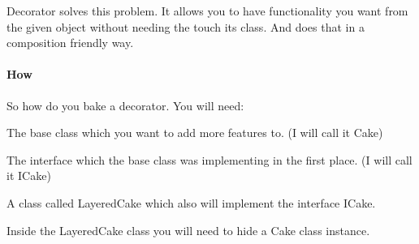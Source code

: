 \documentclass{book}
\begin{document}
Decorator solves this problem. It allows you to have functionality you want from the given object without needing the touch its class. And does that in a composition friendly way.

\paragraph{How}
So how do you bake a decorator.
You will need:

    The base class which you want to add more features to. (I will call it Cake)

    The interface which the base class was implementing in the first place. (I will call it ICake)

    A class called LayeredCake which also will implement the interface ICake.

    Inside the LayeredCake class you will need to hide a Cake class instance.
\end{document}
